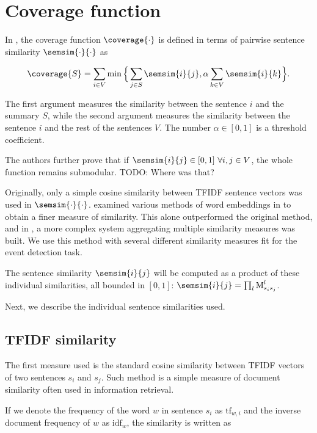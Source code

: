 \section{Coverage function}

In \cite{multi-summarization-2}, the coverage function $\coverage{\cdot}$ is defined in terms of pairwise sentence similarity $\semsim{\cdot}{\cdot}$ as

\begin{equation}
\coverage{S} = \sum_{i \in V}{\min{\Big\{ \sum_{j \in S}{\semsim{i}{j}}, \alpha \sum_{k \in V}{\semsim{i}{k}} \Big\} }}.
\end{equation}

The first argument measures the similarity between the sentence $i$ and the summary $S$, while the second argument measures the similarity between the sentence $i$ and the rest of the sentences $V$. The number $\alpha \in [0,1]$ is a threshold coefficient.

The authors further prove that if $\semsim{i}{j} \in [0,1]\ \forall i, j \in V$, the whole function remains submodular. {\color{red} TODO: Where was that?}

Originally, only a simple cosine similarity between TFIDF sentence vectors \citep{information-retrieval} was used in $\semsim{\cdot}{\cdot}$. \cite{mogren-1} examined various methods of word embeddings in to obtain a finer measure of similarity. This alone outperformed the original method, and in \cite{mogren-2}, a more complex system aggregating multiple similarity measures was built. We use this method with several different similarity measures fit for the event detection task.

The sentence similarity $\semsim{i}{j}$ will be computed as a product of these individual similarities, all bounded in $[0, 1]$: $\semsim{i}{j} = \prod_{l}{\similarity_{s_{i}s_{j}}^{l}}$.

Next, we describe the individual sentence similarities used.

\subsection{TFIDF similarity}

The first measure used is the standard cosine similarity between TFIDF vectors \citep{information-retrieval} of two sentences $s_{i}$ and $s_{j}$. Such method is a simple measure of document similarity often used in information retrieval.

If we denote the frequency of the word $w$ in sentence $s_{i}$ as $\text{tf}_{w,i}$ and the inverse document frequency of $w$ as $\text{idf}_{w}$, the similarity is written as

